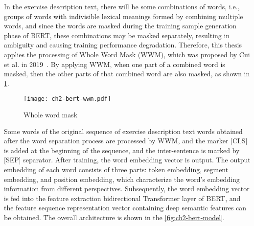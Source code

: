 

In the exercise description text, there will be some combinations of words, i.e., groups of words with indivisible lexical meanings formed by combining multiple words, and since the words are masked during the training sample generation phase of BERT, these combinations may be masked separately, resulting in ambiguity and causing training performance degradation. Therefore, this thesis applies the processing of Whole Word Mask (WWM), which was proposed by Cui et al. in 2019~\cite{cui2019pre}. By applying WWM, when one part of a combined word is masked, then the other parts of that combined word are also masked, as shown in \figurename{\ref{fig:ch2-bert-wwm}}.

\begin{figure}[h]
	\centering
	\texttt{[image: ch2-bert-wwm.pdf]}
	\caption{Whole word mask}\label{fig:ch2-bert-wwm}
\end{figure}


Some words of the original sequence of exercise description text words obtained after the word separation process are processed by WWM, and the marker [CLS] is added at the beginning of the sequence, and the inter-sentence is marked by [SEP] separator. After training, the word embedding vector is output. The output embedding of each word consists of three parts: token embedding, segment embedding, and position embedding, which characterize the word's embedding information from different perspectives. Subsequently, the word embedding vector is fed into the feature extraction bidirectional Transformer layer of BERT, and the feature sequence representation vector containing deep semantic features can be obtained. The overall architecture is shown in the \figurename{\ref{fig:ch2-bert-model}}.


